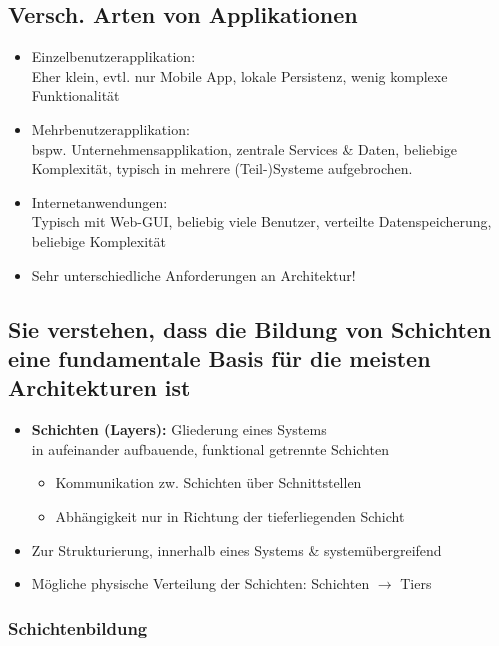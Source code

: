 \documentclass[a4paper]{article}
\begin{document}
			\subsection{Versch. Arten von Applikationen}
			
			\begin{itemize}
				\item Einzelbenutzerapplikation:\\
				Eher klein, evtl. nur Mobile App, lokale Persistenz, wenig komplexe Funktionalität
				\item Mehrbenutzerapplikation:\\
				bspw. Unternehmensapplikation, zentrale Services \& Daten, beliebige Komplexität, typisch in mehrere (Teil-)Systeme aufgebrochen.
				\item Internetanwendungen:\\
				Typisch mit Web-GUI, beliebig viele Benutzer, verteilte Datenspeicherung, beliebige Komplexität\\
				
				\item Sehr unterschiedliche Anforderungen an Architektur!
			\end{itemize}
		
		\subsection{Sie verstehen, dass die Bildung von Schichten eine fundamentale Basis für die meisten Architekturen ist}
		
		\begin{itemize}
			\item \textbf{Schichten (Layers):} Gliederung eines Systems\\
			in aufeinander aufbauende, funktional getrennte Schichten
				\begin{itemize}
					\item Kommunikation zw. Schichten über Schnittstellen
					\item Abhängigkeit nur in Richtung der tieferliegenden Schicht
				\end{itemize}
			\item Zur Strukturierung, innerhalb eines Systems \& systemübergreifend
			\item Mögliche physische Verteilung der Schichten: Schichten $\rightarrow$ Tiers
		\end{itemize}
	
		\newpage
		
			\subsubsection{Schichtenbildung}
			
\end{document}
